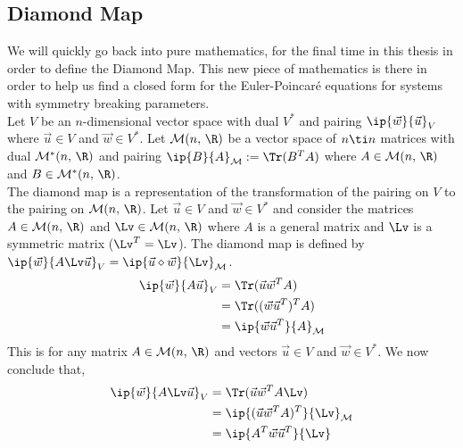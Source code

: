 \subsection{Diamond Map}
We will quickly go back into pure mathematics, for the final time in this thesis in order to define the Diamond Map. This new piece of mathematics is there in order to help us find a closed form for the Euler-Poincar\'e equations for systems with symmetry breaking parameters.\\

\noindent
Let $V$ be an $n$-dimensional vector space with dual $V^*$ and pairing $\ip{\vec w}{\vec u}_V$ where $\vec u \in V$ and $\vec w \in V^*$. Let $\mathcal{M}(n,\,\R)$ be a vector space of $n \ti n$ matrices with dual $\mathcal{M}^*(n,\,\R)$ and pairing $\ip{B}{A}_{\mathcal{M}} := \Tr(B^T A)$
where $A \in \mathcal{M}(n,\,\R)$ and $B \in \mathcal{M}^*(n,\,\R)$.\\

\noindent
The diamond map is a representation of the transformation of the pairing on $V$ to the pairing on $\mathcal{M}(n,\,\R)$. Let $\vec u \in V$ and $\vec w \in V^*$ and consider the matrices $A \in \mathcal{M}(n,\,\R)$ and $\Lv \in \mathcal{M}(n,\,\R)$ where $A$ is a general matrix and $\Lv$ is a symmetric matrix ($\Lv^T = \Lv$). The diamond map is defined by $\ip{\vec w}{A\Lv\vec u}_V = \ip{\vec u \diamond \vec w}{\Lv}_{\mathcal{M}}$.
\begin{align*}
  \ip{\vec w}{A\vec u}_V &= \Tr(\vec u \vec w^T A) \\
  &= \Tr((\vec w \vec u ^T)^T A)\\
  &= \ip{\vec w\vec u^T}{A}_{\mathcal{M}}
\end{align*}
This is for any matrix $A \in \mathcal{M}(n,\,\R)$ and vectors $\vec u \in V$ and $\vec w \in V^*$. We now conclude that,
\begin{align*}
  \ip{\vec w}{A\Lv \vec u}_V &= \Tr(\vec u \vec w^T A\Lv) \\
  &= \ip{(\vec u\vec w^T A)^T}{\Lv}_{\mathcal{M}}\\
  &= \ip{A^T\vec w\vec u^T}{\Lv}
\end{align*}
